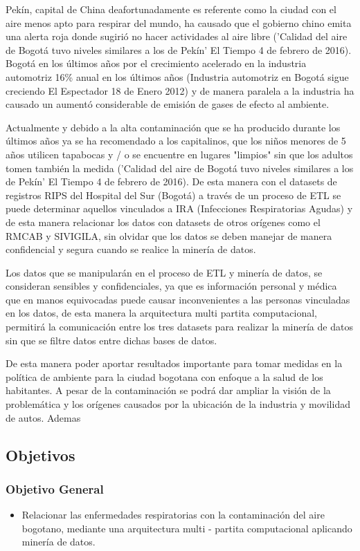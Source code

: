 \documentclass[a4paper, 11pt, oneside]{article}
\theoremstyle{definition}
\theoremstyle{remark}
\begin{document}
Pekín, capital de China deafortunadamente es referente como la ciudad con el aire menos apto para respirar del mundo, ha causado que el gobierno chino emita una alerta roja donde sugirió no hacer actividades al aire libre ('Calidad del aire de Bogotá tuvo niveles similares a los de Pekín' El Tiempo  4 de febrero de 2016). Bogotá en los últimos años por el crecimiento acelerado en la industria automotriz 16\% anual en los últimos años (Industria automotriz en Bogotá sigue creciendo El Espectador 18 de Enero 2012) y de manera paralela a la industria ha causado un aumentó considerable de emisión de gases de efecto al ambiente.

Actualmente y debido a la alta contaminación que se ha producido  durante los últimos años ya se ha recomendado a los capitalinos, que los niños menores de 5 años utilicen tapabocas y / o se encuentre en lugares "limpios" sin que los adultos tomen también la medida ('Calidad del aire de Bogotá tuvo niveles similares a los de Pekín' El Tiempo  4 de febrero de 2016). De esta manera con el datasets de registros RIPS del Hospital del Sur (Bogotá) a través de un proceso de ETL se puede determinar aquellos vinculados a IRA (Infecciones Respiratorias Agudas) y de esta manera relacionar los datos con datasets de otros orígenes como el RMCAB y SIVIGILA, sin olvidar que los datos se deben manejar de manera confidencial y segura cuando se realice la minería de datos.

Los datos que se manipularán en el proceso de ETL y minería de datos, se consideran sensibles y confidenciales, ya que es información personal y médica que en manos equivocadas puede causar inconvenientes a las personas vinculadas en los datos, de esta manera la arquitectura multi partita computacional, permitirá la comunicación entre los tres datasets para realizar la minería de datos sin que se filtre datos entre dichas bases de datos.

De esta manera poder aportar resultados importante para tomar medidas en la política de ambiente para la ciudad bogotana con enfoque a la salud de los habitantes. A pesar de la contaminación se podrá dar ampliar la visión de la problemática y los orígenes causados por la ubicación de la industria y movilidad de autos. Ademas 

\subsection{Objetivos}

\subsubsection{Objetivo General}
\begin{itemize}
\item Relacionar las enfermedades respiratorias con la contaminación del aire bogotano, mediante una arquitectura multi - partita computacional aplicando minería de datos.

\end{itemize}
\end{document}
